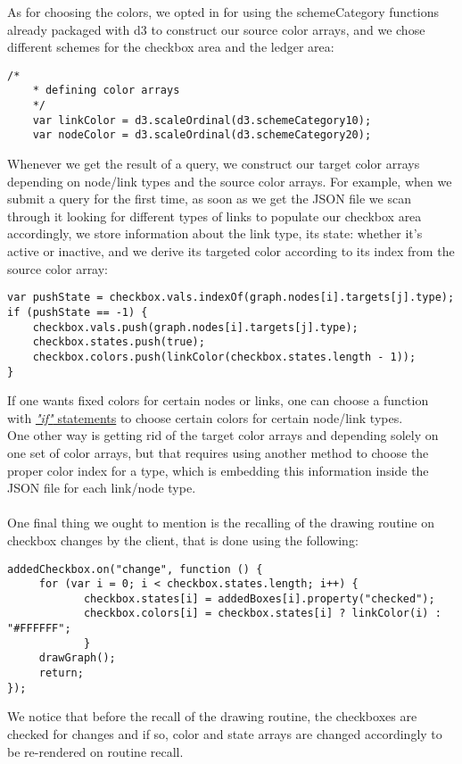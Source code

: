 \documentclass[12pt]{report}
\begin{document}
As for choosing the colors, we opted in for using the schemeCategory functions already packaged with d3 to construct our source color arrays, and we chose different schemes for the checkbox area and the ledger area:
\begin{lstlisting}[style=python]
    /*
    * defining color arrays
    */
    var linkColor = d3.scaleOrdinal(d3.schemeCategory10);
    var nodeColor = d3.scaleOrdinal(d3.schemeCategory20);
\end{lstlisting}
Whenever we get the result of a query, we construct our target color arrays depending on node/link types and the source color arrays.
\newpage
For example, when we submit a query for the first time, as soon as we get the JSON file we scan through it looking for different types of links to populate our checkbox area accordingly, we store information about the link type, its state: whether it's active or inactive, and we derive its targeted color according to its index from the source color array:
\begin{lstlisting}[style=python]
var pushState = checkbox.vals.indexOf(graph.nodes[i].targets[j].type);
if (pushState == -1) {
	checkbox.vals.push(graph.nodes[i].targets[j].type);
	checkbox.states.push(true);
	checkbox.colors.push(linkColor(checkbox.states.length - 1));
}
\end{lstlisting}
If one wants fixed colors for certain nodes or links, one can choose a function with \underline{\textit{"if"} statements} to choose certain colors for certain node/link types.\\
One other way is getting rid of the target color arrays and depending solely on one set of color arrays, but that requires using another method to choose the proper color index for a type, which is embedding this information inside the JSON file for each link/node type.\\\\

One final thing we ought to mention is the recalling of the drawing routine on checkbox changes by the client, that is done using the following:
\begin{lstlisting}[style=python]
addedCheckbox.on("change", function () {
     for (var i = 0; i < checkbox.states.length; i++) {
            checkbox.states[i] = addedBoxes[i].property("checked");
            checkbox.colors[i] = checkbox.states[i] ? linkColor(i) : "#FFFFFF";
            }
     drawGraph();
     return;
});
\end{lstlisting}
We notice that before the recall of the drawing routine, the checkboxes are checked for changes and if so, color and state arrays are changed accordingly to be re-rendered on routine recall.
\end{document}
